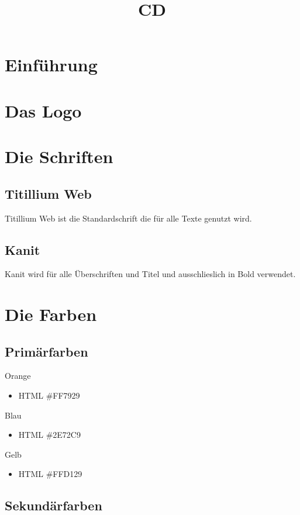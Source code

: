 \documentclass{article}
\begin{document}
\title{CD}

\tableofcontents

\cleardoublepage
\section{Einführung}

\cleardoublepage
\section{Das Logo}

\cleardoublepage
\section{Die Schriften}

\subsection{Titillium Web}

Titillium Web ist die Standardschrift die für alle Texte genutzt wird.

\subsection{Kanit}

Kanit wird für alle Überschriften und Titel und ausschlieslich in Bold verwendet.

\cleardoublepage
\section{Die Farben}

\subsection{Primärfarben}
\cfield[LESOrange]
Orange
\begin{itemize}
\item HTML \#FF7929 
\end{itemize}

\cfield[LESBlue]
Blau
\begin{itemize}
\item HTML \#2E72C9
\end{itemize}

\cfield[LESYellow]
Gelb
\begin{itemize}
\item HTML \#FFD129 
\end{itemize}

\subsection{Sekundärfarben}
\end{document}
